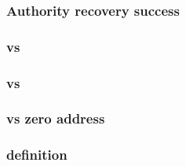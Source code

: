 \subsubsection{Authority recovery success                       } \label{rlp auth: comparisons: validity: authority recovery success}             %
\subsubsection{\locNonce{} vs \locAuthorityNonce{}              } \label{rlp auth: comparisons: validity: nonce vs account nonce}                 %
\subsubsection{\locAuthorityAddress{} vs \locSenderAddress{}    } \label{rlp auth: comparisons: validity: authority vs sender address}            %
\subsubsection{\locAddress{} vs zero address                    } \label{rlp auth: comparisons: validity: address vs zero address}                %
\subsubsection{\locAuthorityTupleIsValidExpression{} definition } \label{rlp auth: comparisons: validity: authority tuple is valid}               %
